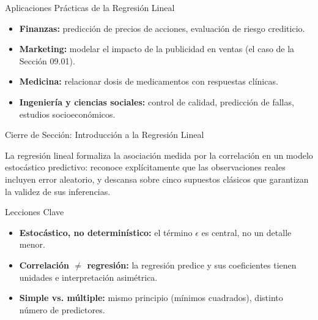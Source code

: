 \documentclass[10pt, aspectratio=169]{beamer}
\begin{document}
\begin{frame}{Aplicaciones Prácticas de la Regresión Lineal}
  \footnotesize
  \begin{itemize}\itemsep=0.1cm
    \item \textbf{Finanzas:} predicción de precios de acciones, evaluación de riesgo crediticio. \pause
    \item \textbf{Marketing:} modelar el impacto de la publicidad en ventas (el caso de la Sección 09.01). \pause
    \item \textbf{Medicina:} relacionar dosis de medicamentos con respuestas clínicas. \pause
    \item \textbf{Ingeniería y ciencias sociales:} control de calidad, predicción de fallas, estudios socioeconómicos.
  \end{itemize}
\end{frame}

\begin{frame}{Cierre de Sección: Introducción a la Regresión Lineal}
  \begin{reflexion}
    La regresión lineal formaliza la asociación medida por la correlación en un modelo estocástico predictivo: reconoce explícitamente que las observaciones reales incluyen error aleatorio, y descansa sobre cinco supuestos clásicos que garantizan la validez de sus inferencias.
  \end{reflexion}

  \vspace{0.2cm}
  \pause
  \begin{block}{Lecciones Clave}
    \begin{itemize}\itemsep=0.08cm
      \item \textbf{Estocástico, no determinístico:} el término $\epsilon$ es central, no un detalle menor.
      \item \textbf{Correlación $\neq$ regresión:} la regresión predice y sus coeficientes tienen unidades e interpretación asimétrica.
      \item \textbf{Simple vs. múltiple:} mismo principio (mínimos cuadrados), distinto número de predictores.
    \end{itemize}
  \end{block}
\end{frame}
\end{document}
